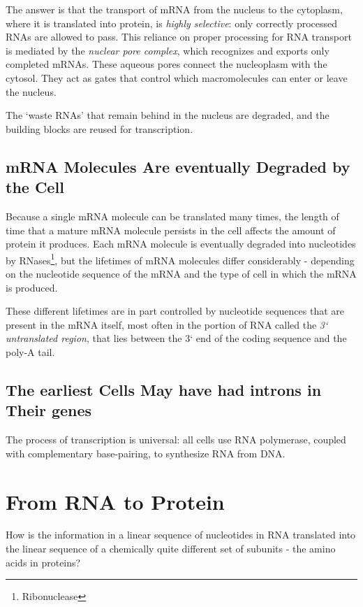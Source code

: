 The answer is that the transport of mRNA from the nucleus to the
cytoplasm, where it is translated into protein, is \textit{highly selective}: only
correctly processed RNAs are allowed to pass. This reliance on proper
processing for RNA transport is mediated by the \textit{nuclear pore complex},
which recognizes and exports only completed mRNAs. These aqueous
pores connect the nucleoplasm with the cytosol.
They act as gates that control which macromolecules can
enter or leave the nucleus.

The ‘waste RNAs’ that remain behind in the nucleus are degraded, and the building
blocks are reused for transcription.

\subsection{mRNA Molecules Are eventually Degraded by the Cell}

Because a single mRNA molecule can be translated many times, the length of time
that a mature mRNA molecule persists in the cell affects the amount of protein it produces.
Each mRNA molecule is eventually degraded into nucleotides by RNases\footnote{Ribonuclease}, but the lifetimes
of mRNA molecules differ considerably - depending on the nucleotide
sequence of the mRNA and the type of cell in which the mRNA is produced.

These different lifetimes are in part controlled by nucleotide sequences
that are present in the mRNA itself, most often in the portion of RNA
called the \textit{3` untranslated region}, that lies between the 3` end of the coding
sequence and the poly-A tail.

\subsection{The earliest Cells May have had introns in Their genes}

The process of transcription is universal: all cells use RNA polymerase,
coupled with complementary base-pairing, to synthesize RNA from DNA.

\section{From RNA to Protein}

How is the information in a linear
sequence of nucleotides in RNA translated into the linear sequence of a
chemically quite different set of subunits - the amino acids in proteins?

